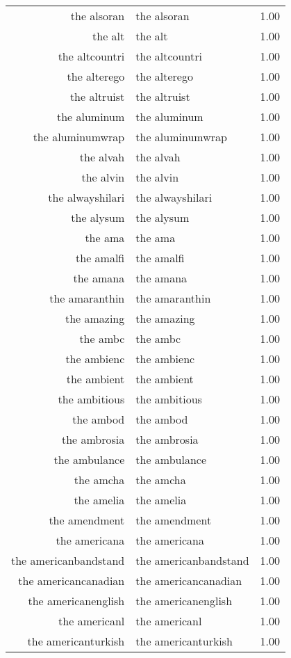 \begin{table}[ht]
\begin{tabular}{rlr}
  the alsoran & the alsoran & 1.00 \\ 
  the alt & the alt & 1.00 \\ 
  the altcountri & the altcountri & 1.00 \\ 
  the alterego & the alterego & 1.00 \\ 
  the altruist & the altruist & 1.00 \\ 
  the aluminum & the aluminum & 1.00 \\ 
  the aluminumwrap & the aluminumwrap & 1.00 \\ 
  the alvah & the alvah & 1.00 \\ 
  the alvin & the alvin & 1.00 \\ 
  the alwayshilari & the alwayshilari & 1.00 \\ 
  the alysum & the alysum & 1.00 \\ 
  the ama & the ama & 1.00 \\ 
  the amalfi & the amalfi & 1.00 \\ 
  the amana & the amana & 1.00 \\ 
  the amaranthin & the amaranthin & 1.00 \\ 
  the amazing & the amazing & 1.00 \\ 
  the ambc & the ambc & 1.00 \\ 
  the ambienc & the ambienc & 1.00 \\ 
  the ambient & the ambient & 1.00 \\ 
  the ambitious & the ambitious & 1.00 \\ 
  the ambod & the ambod & 1.00 \\ 
  the ambrosia & the ambrosia & 1.00 \\ 
  the ambulance & the ambulance & 1.00 \\ 
  the amcha & the amcha & 1.00 \\ 
  the amelia & the amelia & 1.00 \\ 
  the amendment & the amendment & 1.00 \\ 
  the americana & the americana & 1.00 \\ 
  the americanbandstand & the americanbandstand & 1.00 \\ 
  the americancanadian & the americancanadian & 1.00 \\ 
  the americanenglish & the americanenglish & 1.00 \\ 
  the americanl & the americanl & 1.00 \\ 
  the americanturkish & the americanturkish & 1.00 \\ 

\end{tabular}
\end{table}

